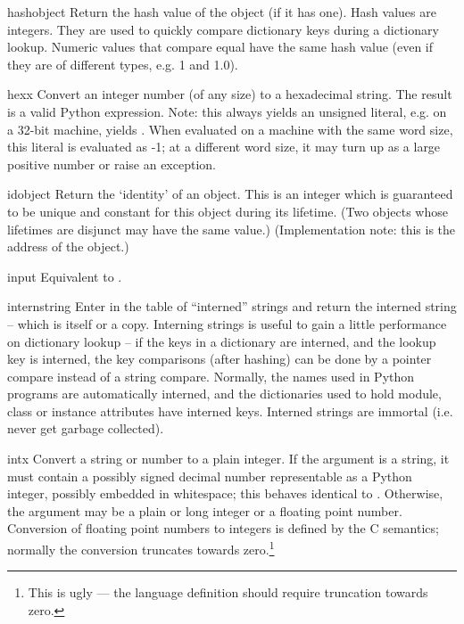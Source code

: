 \begin{funcdesc}{hash}{object}
  Return the hash value of the object (if it has one).  Hash values
  are integers.  They are used to quickly compare dictionary
  keys during a dictionary lookup.  Numeric values that compare equal
  have the same hash value (even if they are of different types, e.g.
  1 and 1.0).
\end{funcdesc}

\begin{funcdesc}{hex}{x}
  Convert an integer number (of any size) to a hexadecimal string.
  The result is a valid Python expression.  Note: this always yields
  an unsigned literal, e.g. on a 32-bit machine,  yields
  .  When evaluated on a machine with the same
  word size, this literal is evaluated as -1; at a different word
  size, it may turn up as a large positive number or raise an
   exception.
\end{funcdesc}

\begin{funcdesc}{id}{object}
  Return the `identity' of an object.  This is an integer which is
  guaranteed to be unique and constant for this object during its
  lifetime.  (Two objects whose lifetimes are disjunct may have the
  same  value.)  (Implementation note: this is the
  address of the object.)
\end{funcdesc}

\begin{funcdesc}{input}{}
  Equivalent to .
\end{funcdesc}

\begin{funcdesc}{intern}{string}
  Enter  in the table of ``interned'' strings and return
  the interned string -- which is  itself or a copy.
  Interning strings is useful to gain a little performance on
  dictionary lookup -- if the keys in a dictionary are interned, and
  the lookup key is interned, the key comparisons (after hashing) can
  be done by a pointer compare instead of a string compare.  Normally,
  the names used in Python programs are automatically interned, and
  the dictionaries used to hold module, class or instance attributes
  have interned keys.  Interned strings are immortal (i.e. never get
  garbage collected).
\end{funcdesc}

\begin{funcdesc}{int}{x}
  Convert a string or number to a plain integer.  If the argument is a
  string, it must contain a possibly signed decimal number
  representable as a Python integer, possibly embedded in whitespace;
  this behaves identical to .
  Otherwise, the argument may be a plain or
  long integer or a floating point number.  Conversion of floating
  point numbers to integers is defined by the C semantics; normally
  the conversion truncates towards zero.\footnote{This is ugly --- the
  language definition should require truncation towards zero.}
\end{funcdesc}

